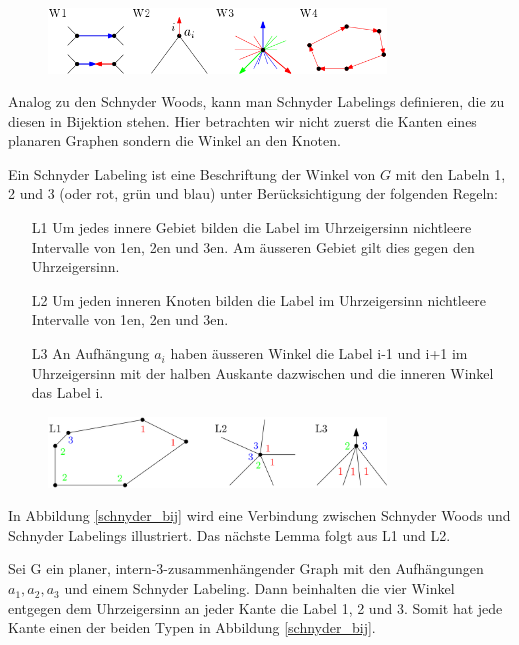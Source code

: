 \begin{figure}[h]
	\centering
  \includegraphics[width=0.8\textwidth]{schnyder_wood_def.png}
\end{figure}

Analog zu den Schnyder Woods, kann man Schnyder Labelings definieren, die zu diesen in Bijektion stehen. Hier betrachten wir nicht zuerst die Kanten eines planaren Graphen sondern die Winkel an den Knoten.

\begin{definition}\label{def_sl}
Ein Schnyder Labeling ist eine Beschriftung der Winkel von $G$ mit den Labeln 1, 2 und 3 (oder rot, grün und blau) unter Berücksichtigung der folgenden Regeln:
\begin{itemize}
\item[L1] Um jedes innere Gebiet bilden die Label im Uhrzeigersinn nichtleere Intervalle von 1en, 2en und 3en. Am äusseren Gebiet gilt dies gegen den Uhrzeigersinn.
\item[L2] Um jeden inneren Knoten bilden die Label im Uhrzeigersinn nichtleere Intervalle von 1en, 2en und 3en.
\item[L3] An Aufhängung $a_i$ haben äusseren Winkel die Label i-1 und i+1 im Uhrzeigersinn mit der halben Auskante dazwischen und die inneren Winkel das Label i.
\end{itemize} 
\begin{figure}[h]
	\centering
  \includegraphics[width=0.8\textwidth]{schnyder_label_def.png}
\end{figure}
\end{definition}

In Abbildung \ref{schnyder_bij} wird eine Verbindung zwischen Schnyder Woods und Schnyder Labelings illustriert. Das nächste Lemma folgt aus L1 und L2.

\begin{lemma}\label{lem_sl}
Sei G ein planer, intern-3-zusammenhängender Graph mit den Aufhängungen $a_1,a_2,a_3$ und einem Schnyder Labeling. Dann beinhalten die vier Winkel entgegen dem Uhrzeigersinn an jeder Kante die Label 1, 2 und 3. Somit hat jede Kante einen der beiden Typen in Abbildung \ref{schnyder_bij}.
\end{lemma}

